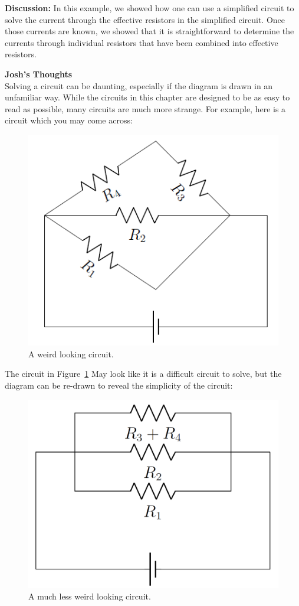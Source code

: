 \begin{framed}
\begin{framed}
\textbf{Discussion:} In this example, we showed how one can use a simplified circuit to solve the current through the effective resistors in the simplified circuit. Once those currents are known, we showed that it is straightforward to determine the currents through individual resistors that have been combined into effective resistors.
\end{framed}
\end{framed}

\begin{framed}
\textbf{Josh's Thoughts}\\
Solving a circuit can be daunting, especially if the diagram is drawn in an unfamiliar  way. While the circuits in this chapter are designed to be as easy to read as possible, many circuits are much more strange. For example, here is a circuit which you may come across:

\begin{figure}[!htbp]
\centering
\includegraphics[width=0.4\linewidth]{files/circuit1Josh-7520d0c8826bca1fc6e734a164b2bfb1.png}
\caption[]{A weird looking circuit.}
\label{fig:circuits:circuit1Josh}
\end{figure}

The circuit in Figure~\ref{fig:circuits:circuit1Josh} May look like it is a difficult circuit to solve, but the diagram can be re-drawn to reveal the simplicity of the circuit:

\begin{figure}[!htbp]
\centering
\includegraphics[width=0.4\linewidth]{files/circuit2Josh-4cb1604ed35f8db5448b4c644cbb8f91.png}
\caption[]{A much less weird looking circuit.}
\label{fig:circuits:circuit2Josh}
\end{figure}


\end{framed}

